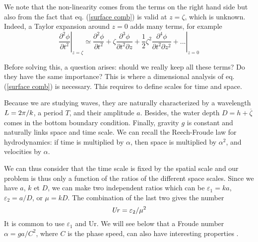 We note that the non-linearity comes from the terms on the right hand side but also from the fact that  eq. (\ref{surface comb}) 
is valid  at $z=\zeta$, which is unknown. Indeed,  a Taylor expansion around $z=0$ adds many terms, for example 
\begin{equation}
\left. \frac{\partial^2{\phi}}{\partial{t^2}} \right|_{z=\zeta} \simeq \left. \frac{\partial^2{\phi}}{\partial{t^2}} + \zeta \frac{\partial^3{\phi}}{\partial{t^2} \partial z}  
+ \frac{1}{2}\zeta^2 \frac{\partial^4{\phi}}{\partial{t^2} \partial z^2} + ...  \right|_{z=0}
\end{equation}


Before solving this, a question arises: should we really keep all these terms? Do they have the same importance?  This is where a dimensional 
analysis of  eq. (\ref{surface comb}) is necessary. This requires to define scales for time and space. 

Because we are studying waves, they are naturally characterized by a wavelength  $L=2 \pi/k$, a period $T$, and their amplitude $a$. 
Besides, the water depth  $D=h+\overline{\zeta}$
comes in the bottom boundary condition. Finally, gravity 
$g$ is constant and naturally links space and time scale. We can recall the Reech-Froude law for hydrodynamics: if time is multiplied by  $\alpha$,
then space is multiplied by  $\alpha^2$, and velocities by  $\alpha$.

We can thus consider that the time scale is fixed by the spatial scale and our problem is thus only a function of the 
ratios of the different space scales. Since we have  $a$, $k$ et $D$, we can make two independent ratios which can be  $\varepsilon_1= k a$,
 $\varepsilon_2= a/D$, or $\mu=kD$. The combination of the last two gives the \cite{Ursell1953} number  
 \begin{equation}
\mbox{\textit{Ur}}=\varepsilon_2/\mu^2
 \end{equation}
It is common to use  $\varepsilon_1$ and
$\mathrm{Ur}$. We will see below that a Froude number $\alpha=g a /
C^2$, where $C$ is the phase speed, can also have interesting properties \citep{Kirby1998}.


